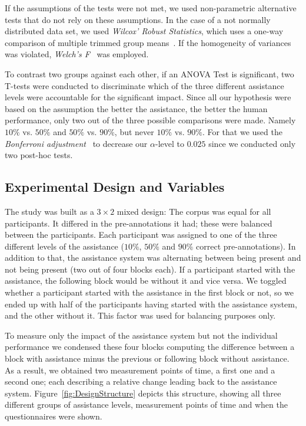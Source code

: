 		If the assumptions of the tests were not met, we used non-parametric alternative tests that do not rely on these assumptions. In the case of a not normally distributed data set, we used \textit{Wilcox' Robust Statistics}, which uses a one-way comparison of multiple trimmed group means~\cite{mair2016robust}. If the homogeneity of variances was violated, \textit{Welch's F}~\cite{welch1951comparison} was employed.

		To contrast two groups against each other, if an ANOVA Test is significant, two T-tests were conducted to discriminate which of the three different assistance levels were accountable for the significant impact. Since all our hypothesis were based on the assumption \lqq the better the assistance, the better the human performance\rqq, only two out of the three possible comparisons were made. Namely \(10\%\) vs. \(50\%\) and \(50\%\) vs. \(90\%\), but never \(10\%\) vs. \(90\%\). For that we used the \textit{Bonferroni adjustment}~\cite{bonferroni1936teoria} to decrease our \(\alpha\)-level to \(0.025\) since we conducted only two post-hoc tests.

	\subsection{Experimental Design and Variables}
		\label{sec:methodDesignAndVars}

		The study was built as a \(3 \times 2\) mixed design: The corpus was equal for all participants. It differed in the pre-annotations it had; these were balanced between the participants. Each participant was assigned to one of the three different levels of the assistance (\(10\%\), \(50\%\) and \(90\%\) correct pre-annotations). In addition to that, the assistance system was alternating between being present and not being present (two out of four blocks each). If a participant started with the assistance, the following block would be without it and vice versa. We toggled whether a participant started with the assistance in the first block or not, so we ended up with half of the participants having started with the assistance system, and the other without it. This factor was used for balancing purposes only.

		To measure only the impact of the assistance system but not the individual performance we condensed these four blocks computing the difference between a block with assistance minus the previous or following block without assistance. As a result, we obtained two measurement points of time, a first one and a second one; each describing a relative change leading back to the assistance system. Figure~\ref{fig:DesignStructure} depicts this structure, showing all three different groups of assistance levels, measurement points of time and when the questionnaires were shown.

